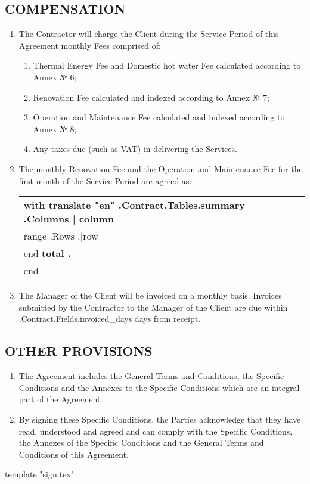 \subsection{COMPENSATION}
\begin{enumerate}
	\item	The Contractor will charge the Client during the Service Period of this Agreement monthly Fees comprised of:
	\begin{enumerate}
		\item	Thermal Energy Fee and Domestic hot water Fee calculated according to Annex № 6;
		\item	Renovation Fee calculated and indexed according to Annex № 7;
		\item	Operation and Maintenance Fee calculated and indexed according to Annex № 8;
		\item	Any taxes due (such as VAT) in delivering the Services.

	\end{enumerate}
	\item	The monthly Renovation Fee and the Operation and Maintenance Fee for the first month of the Service Period are agreed as:
\begin{center}
	\begin{tabu}{|X|X|X|X|}\tabucline{}\rowfont[c]\bfseries
	{{with translate "en" .Contract.Tables.summary}} %
	{{.Columns | column}} \\\tabucline{}
	{{range .Rows}} %
	{{.|row}} \\\tabucline{}
	{{end}}
	\bfseries {{total .}} \\\tabucline{} %
	{{end}}
	\end{tabu}
\end{center}


	\item	The Manager of the Client will be invoiced on a monthly basis. Invoices submitted by the Contractor to the Manager of the Client are due within \iffalse input fields.invoiced_days value="{{.Contract.Fields.invoiced_days}}" \fi {{.Contract.Fields.invoiced_days}} days from receipt.
\end{enumerate}

\subsection{OTHER PROVISIONS}
\begin{enumerate}
	\item	The Agreement includes the General Terms and Conditions, the Specific Conditions and the Annexes to the Specific Conditions which are an integral part of the Agreement.
	\item	By signing these Specific Conditions, the Parties acknowledge that they have read, understood and agreed and can comply with the Specific Conditions, the Annexes of the Specific Conditions and the General Terms and Conditions of this Agreement.
\end{enumerate}
{{template "sign.tex"}} %

